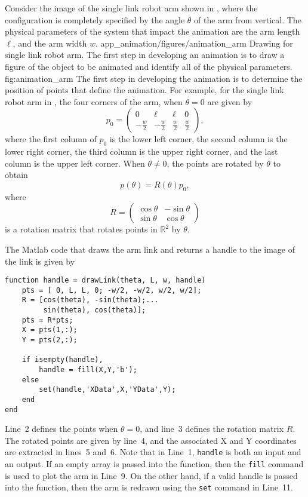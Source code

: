 Consider the image of the single link robot arm shown in , where the configuration is completely specified by the angle $\theta$ of the arm from vertical.  The physical parameters of the system that impact the animation are the arm length $\ell$, and the arm width $w$.
	{app_animation/figures/animation_arm}
	{Drawing for single link robot arm.  The first step in developing an animation is to draw a figure of the object to be animated and identify all of the physical parameters.}
	{fig:animation_arm}
The first step in developing the animation is to determine the position of points that define the animation.  For example, for the single link robot arm in , the four corners of the arm, when $\theta=0$ are given by
\[
p_0 = \begin{pmatrix} 0 & \ell & \ell & 0 \\ -\frac{w}{2} & -\frac{w}{2} & \frac{w}{2} & \frac{w}{2} \end{pmatrix},
\]
where the first column of $p_0$ is the lower left corner, the second column is the lower right corner, the third column is the upper right corner, and the last column is the upper left corner.  When $\theta\neq 0$, the points are rotated by $\theta$ to obtain
\[
p(\theta) = R(\theta) p_0,
\]
where 
\[
R=\begin{pmatrix} \cos\theta & -\sin\theta \\ \sin\theta & \cos\theta \end{pmatrix}
\]
is a rotation matrix that rotates points in $\mathbb{R}^2$ by $\theta$.

The Matlab code that draws the arm link and returns a handle to the image of the link is given by
\begin{lstlisting}
function handle = drawLink(theta, L, w, handle)
  	pts = [ 0, L, L, 0; -w/2, -w/2, w/2, w/2];
	R = [cos(theta), -sin(theta);...
	     sin(theta), cos(theta)];
  	pts = R*pts;
  	X = pts(1,:);
  	Y = pts(2,:);
  
  	if isempty(handle),
    	handle = fill(X,Y,'b');
  	else
    	set(handle,'XData',X,'YData',Y);
  	end
end
\end{lstlisting}
Line~2 defines the points when $\theta=0$, and line~3 defines the rotation matrix $R$.  
The rotated points are given by line~4, and the associated X and Y coordinates are extracted in lines~5 and~6.
Note that in Line~1, {\tt handle} is both an input and an output.  If an empty array is passed into the function, then the {\tt fill} command is used to plot the arm in Line~9.  On the other hand, if a valid handle is passed into the function, then the arm is redrawn using the {\tt set} command in Line~11.

